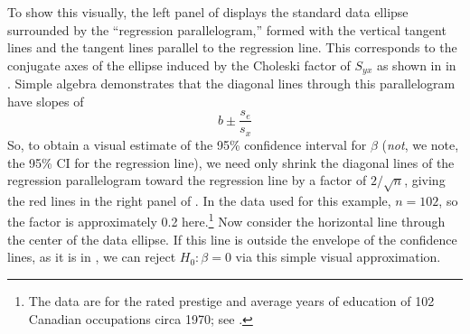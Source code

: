 To show this visually, the left panel of  displays the standard data ellipse
surrounded by the ``regression parallelogram,'' formed with the vertical tangent lines and the
tangent lines parallel to the regression line. This corresponds to the conjugate axes of the
ellipse induced by the Choleski factor of $S_{yx}$ as shown in  in .
Simple algebra demonstrates that the diagonal lines through
this parallelogram have slopes of
\begin{equation*}
 b \pm \frac{s_{e}}{s_x}
\end{equation*}
So, to obtain a visual estimate of the 95\% confidence interval for $\beta$ (\emph{not}, we note, the 95\% CI for the regression line), we need only shrink the diagonal lines of the
regression parallelogram toward the regression line by a factor of $2/\sqrt{n}$, giving the red lines
in the right panel of .
In the data used for this
example, $n=102$, so the factor  is approximately 0.2 here.\footnote{The data are for the rated prestige and average years of education of 102 Canadian occupations circa 1970; see \citet{FoxSuschnigg:89}.}
Now consider the horizontal line through the center of the data ellipse.  If this line is outside the
envelope of the confidence lines, as it is in , we can reject $H_0: \beta = 0$ via this simple visual approximation.
